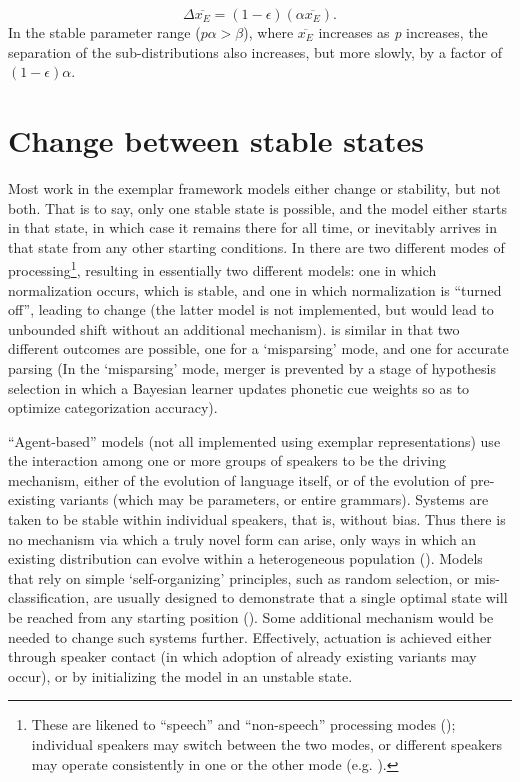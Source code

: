 \begin{equation}
\varDelta\overline{x_{E}}=(1-\epsilon)(\alpha\overline{x_{E}}).\label{eq:Cat Sep}
\end{equation}
In the stable parameter range ($p\alpha>\beta$), where $\overline{x_{E}}$
increases as \emph{p} increases, the separation of the sub-distributions
also increases, but more slowly, by a factor of $(1-\epsilon)\alpha$.

\section{\label{sec:Actuation}Change between stable states}

Most work in the exemplar framework models either change or stability,
but not both. That is to say, only one stable state is possible, and
the model either starts in that state, in which case it remains there
for all time, or inevitably arrives in that state from any other starting
conditions. In \citet{Garrett2013} there are two different modes
of processing\footnote{These are likened to “speech” and “non-speech” processing
modes (\citealt{liberman1967perception}); individual speakers may
switch between the two modes, or different speakers may operate consistently
in one or the other mode (e.g. \citealt{yu2013socio}). }, resulting in essentially two different models: one in which normalization
occurs, which is stable, and one in which normalization is “turned
off”, leading to change (the latter model is not implemented, but
would lead to unbounded shift without an additional mechanism). \citet{Kirby2014}
is similar in that two different outcomes are possible, one for a
`misparsing' mode, and one for accurate parsing (In the `misparsing'
mode, merger is prevented by a stage of hypothesis selection in which
a Bayesian learner updates phonetic cue weights so as to optimize
categorization accuracy). 

“Agent-based” models (not all implemented using exemplar representations)
use the interaction among one or more groups of speakers to be the
driving mechanism, either of the evolution of language itself, or
of the evolution of pre-existing variants (which may be parameters,
or entire grammars). Systems are taken to be stable within individual
speakers, that is, without bias. Thus there is no mechanism via which
a truly novel form can arise, only ways in which an existing distribution
can evolve within a heterogeneous population (\citealt{Niyogi1997,Boer2000,nowak2001evolution,Steels2005,baxter2006utterance,oudeyer2006self,fagyal2010centers,stanford2013revisiting,pierrehumbert2014model}).
Models that rely on simple `self-organizing' principles, such as random
selection, or mis-classification, are usually designed to demonstrate
that a single optimal state will be reached from any starting position
(\citealp{Wedela,ettlinger2007exemplar,Wedel2006,Blevins2009,DBLP:journals/corr/Tupper14a,wedel2017category}).
Some additional mechanism would be needed to change such systems further.
Effectively, actuation is achieved either through speaker contact
(in which adoption of already existing variants may occur), or by
initializing the model in an unstable state. 

